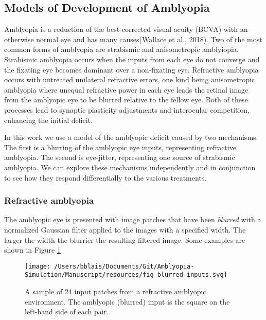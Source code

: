 \documentclass[
  onecolumn]{article}
\begin{document}
\hypertarget{models-of-development-of-amblyopia}{%
\subsection{Models of Development of
Amblyopia}\label{models-of-development-of-amblyopia}}

Amblyopia is a reduction of the best-corrected visual acuity (BCVA) with
an otherwise normal eye and has many causes(Wallace et al., 2018). Two
of the most common forms of amblyopia are strabismic and anisometropic
amblyiopia. Strabismic amblyopia occurs when the inputs from each eye do
not converge and the fixating eye becomes dominant over a non-fixating
eye. Refractive amblyopia occurs with untreated unilateral refractive
errors, one kind being anisometropic amblyopia where unequal refractive
power in each eye leads the retinal image from the amblyopic eye to be
blurred relative to the fellow eye. Both of these processes lead to
synaptic plasticity adjustments and interocular competition, enhancing
the initial deficit.

In this work we use a model of the amblyopic deficit caused by two
mechanisms. The first is a blurring of the amblyopic eye inputs,
representing refractive amblyopia. The second is eye-jitter,
representing one source of strabismic amblyopia. We can explore these
mechanisms independently and in conjunction to see how they respond
differentially to the various treatments.

\hypertarget{refractive-amblyopia}{%
\subsubsection{Refractive amblyopia}\label{refractive-amblyopia}}

The amblyopic eye is presented with image patches that have been
\emph{blurred} with a normalized Gaussian filter applied to the images
with a specified width. The larger the width the blurrier the resulting
filtered image. Some examples are shown in Figure
\ref{fig:blurred-inputs}

\begin{figure}
\hypertarget{fig:blurred-inputs}{%
\centering
\texttt{[image: /Users/bblais/Documents/Git/Amblyopia-Simulation/Manuscript/resources/fig-blurred-inputs.svg]}
\caption{A sample of 24 input patches from a refractive amblyopic
environment. The amblyopic (blurred) input is the square on the
left-hand side of each pair.}\label{fig:blurred-inputs}
}
\end{figure}
\end{document}
